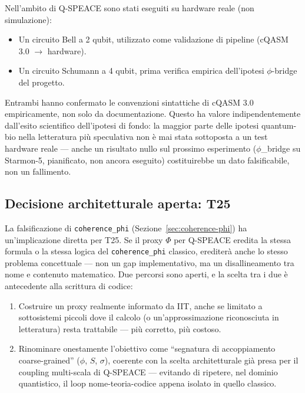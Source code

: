 \documentclass[11pt,a4paper]{article}
\newcommand{\code}[1]{\texttt{#1}}
\newcommand{\coherencephi}{\code{coherence\_phi}}
\newcommand{\starmon}{Starmon-5\xspace}
\begin{document}
Nell'ambito di Q-SPEACE sono stati eseguiti su hardware reale (non simulazione):

\begin{itemize}
  \item Un circuito Bell a 2 qubit, utilizzato come validazione di pipeline (cQASM 3.0 $\to$ hardware).
  \item Un circuito Schumann a 4 qubit, prima verifica empirica dell'ipotesi $\phi$-bridge del progetto.
\end{itemize}

Entrambi hanno confermato le convenzioni sintattiche di cQASM 3.0 empiricamente, non solo da documentazione. Questo ha valore indipendentemente dall'esito scientifico dell'ipotesi di fondo: la maggior parte delle ipotesi quantum-bio nella letteratura pi\`u speculativa non \`e mai stata sottoposta a un test hardware reale --- anche un risultato nullo sul prossimo esperimento ($\phi$\_bridge su \starmon, pianificato, non ancora eseguito) costituirebbe un dato falsificabile, non un fallimento.

\subsection{Decisione architetturale aperta: T25}
\label{sec:t25}

La falsificazione di \coherencephi{} (Sezione~\ref{sec:coherence-phi}) ha un'implicazione diretta per T25. Se il proxy $\Phi$ per Q-SPEACE eredita la stessa formula o la stessa logica del \coherencephi{} classico, erediter\`a anche lo stesso problema concettuale --- non un gap implementativo, ma un disallineamento tra nome e contenuto matematico. Due percorsi sono aperti, e la scelta tra i due \`e antecedente alla scrittura di codice:

\begin{enumerate}
  \item[(a)] Costruire un proxy realmente informato da IIT, anche se limitato a sottosistemi piccoli dove il calcolo (o un'approssimazione riconosciuta in letteratura) resta trattabile --- pi\`u corretto, pi\`u costoso.
  \item[(b)] Rinominare onestamente l'obiettivo come ``segnatura di accoppiamento coarse-grained'' ($\phi$, $S$, $\sigma$), coerente con la scelta architetturale gi\`a presa per il coupling multi-scala di Q-SPEACE --- evitando di ripetere, nel dominio quantistico, il loop nome-teoria-codice appena isolato in quello classico.
\end{enumerate}
\end{document}
